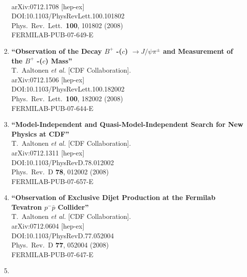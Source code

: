\documentclass{article}
\begin{document}
\begin{enumerate}
  \\{}arXiv:0712.1708 [hep-ex]
  \\{}DOI:10.1103/PhysRevLett.100.101802
  \\{}Phys.\ Rev.\ Lett.\  {\bf 100}, 101802 (2008)
  \\{}FERMILAB-PUB-07-649-E
\item%
{\bf ``Observation of the Decay $B^+$ -($c$) $\to J/\psi \pi^\pm$ and Measurement of the $B^+$ -($c$) Mass''}
  \\{}T.~Aaltonen {\it et al.} [CDF Collaboration].
  \\{}arXiv:0712.1506 [hep-ex]
  \\{}DOI:10.1103/PhysRevLett.100.182002
  \\{}Phys.\ Rev.\ Lett.\  {\bf 100}, 182002 (2008)
  \\{}FERMILAB-PUB-07-644-E
\item%
{\bf ``Model-Independent and Quasi-Model-Independent Search for New Physics at CDF''}
  \\{}T.~Aaltonen {\it et al.} [CDF Collaboration].
  \\{}arXiv:0712.1311 [hep-ex]
  \\{}DOI:10.1103/PhysRevD.78.012002
  \\{}Phys.\ Rev.\ D {\bf 78}, 012002 (2008)
  \\{}FERMILAB-PUB-07-657-E
\item%
{\bf ``Observation of Exclusive Dijet Production at the Fermilab Tevatron $p^- \bar{p}$ Collider''}
  \\{}T.~Aaltonen {\it et al.} [CDF Collaboration].
  \\{}arXiv:0712.0604 [hep-ex]
  \\{}DOI:10.1103/PhysRevD.77.052004
  \\{}Phys.\ Rev.\ D {\bf 77}, 052004 (2008)
  \\{}FERMILAB-PUB-07-647-E
\item%

\end{enumerate}
\end{document}
